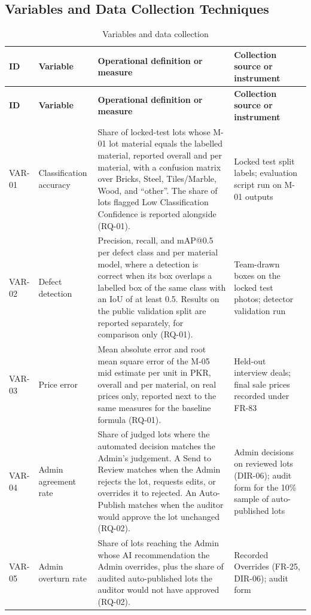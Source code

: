 \subsection{Variables and Data Collection Techniques}
{\footnotesize
\begin{longtable}{@{}>{\raggedright\arraybackslash}p{}>{\raggedright\arraybackslash}p{}>{\raggedright\arraybackslash}p{}>{\raggedright\arraybackslash}p{}@{}}
\caption{Variables and data collection}\label{tab:variables}\\
\toprule
\textbf{ID} & \textbf{Variable} & \textbf{Operational definition or measure} & \textbf{Collection source or instrument} \\
\midrule
\endfirsthead
\toprule
\textbf{ID} & \textbf{Variable} & \textbf{Operational definition or measure} & \textbf{Collection source or instrument} \\
\midrule
\endhead
VAR-01 & Classification accuracy & Share of locked-test lots whose M-01 lot material equals the labelled material, reported overall and per material, with a confusion matrix over Bricks, Steel, Tiles/Marble, Wood, and ``other''. The share of lots flagged Low Classification Confidence is reported alongside (RQ-01). & Locked test split labels; evaluation script run on M-01 outputs \\
VAR-02 & Defect detection & Precision, recall, and mAP@0.5 per defect class and per material model, where a detection is correct when its box overlaps a labelled box of the same class with an IoU of at least 0.5. Results on the public validation split are reported separately, for comparison only (RQ-01). & Team-drawn boxes on the locked test photos; detector validation run \\
VAR-03 & Price error & Mean absolute error and root mean square error of the M-05 mid estimate per unit in PKR, overall and per material, on real prices only, reported next to the same measures for the baseline formula (RQ-01). & Held-out interview deals; final sale prices recorded under FR-83 \\
VAR-04 & Admin agreement rate & Share of judged lots where the automated decision matches the Admin's judgement. A Send to Review matches when the Admin rejects the lot, requests edits, or overrides it to rejected. An Auto-Publish matches when the auditor would approve the lot unchanged (RQ-02). & Admin decisions on reviewed lots (DIR-06); audit form for the 10\% sample of auto-published lots \\
VAR-05 & Admin overturn rate & Share of lots reaching the Admin whose AI recommendation the Admin overrides, plus the share of audited auto-published lots the auditor would not have approved (RQ-02). & Recorded Overrides (FR-25, DIR-06); audit form \\

\end{longtable}}
